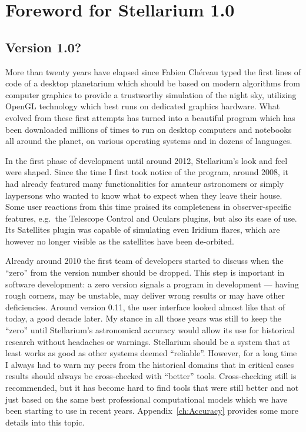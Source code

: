 
\chapter*{Foreword for Stellarium 1.0}
\label{ch:Foreword}

\section*{Version 1.0?}

More than twenty years have elapsed since Fabien Ch\'ereau typed the
first lines of code of a desktop planetarium which should be based on
modern algorithms from computer graphics to provide a trustworthy
simulation of the night sky, utilizing OpenGL technology which best
runs on dedicated graphics hardware. What evolved from these first
attempts has turned into a beautiful program which has been
downloaded millions of times to run on desktop computers and notebooks
all around the planet, on various operating systems and in dozens of
languages.

In the first phase of development until around 2012, Stellarium's look
and feel were shaped. Since the time I first took notice of the
program, around 2008, it had already featured many functionalities for
amateur astronomers or simply laypersons who wanted to know what to
expect when they leave their house. Some user reactions from this time
praised its completeness in observer-specific features, e.g.\ the
Telescope Control and Oculars plugins, but also its ease of use. Its
Satellites plugin was capable of simulating even Iridium flares, which
are however no longer visible as the satellites have been de-orbited. 

Already around 2010 the first team of developers started to discuss
when the ``zero'' from the version number should be dropped. This step
is important in software development: a zero version signals a
program in development --- having rough corners, may be unstable, may
deliver wrong results or may have other deficiencies. Around version 0.11,
the user interface looked almost like that of today, a good decade later.
My stance in all those years was still 
to keep the ``zero'' until Stellarium's astronomical accuracy would
allow its use for historical research without headaches or
warnings. Stellarium should be a system that at least works as good as
other systems deemed ``reliable''. However, for a long time I always
had to warn my peers from the historical domains that in critical cases results should always 
be cross-checked with ``better'' tools. Cross-checking still is
recommended, but it has become hard to find tools that were still better and
not just based on the same best professional computational models which we have
been starting to use in recent years. Appendix~\ref{ch:Accuracy}
provides some more details into this topic.

